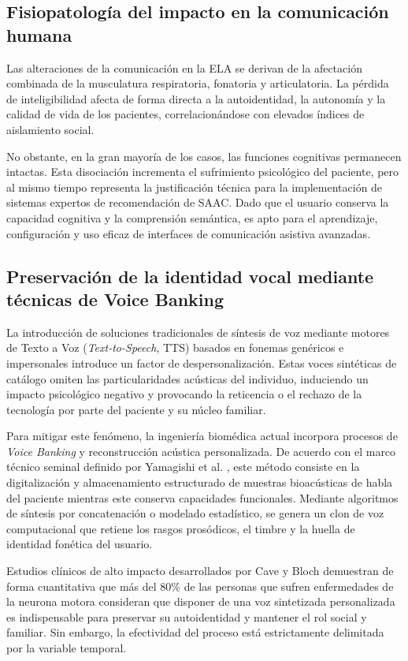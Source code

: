 \subsection{Fisiopatología del impacto en la comunicación humana}
Las alteraciones de la comunicación en la ELA se derivan de la afectación combinada de la musculatura respiratoria, fonatoria y articulatoria. La pérdida de inteligibilidad afecta de forma directa a la autoidentidad, la autonomía y la calidad de vida de los pacientes, correlacionándose con elevados índices de aislamiento social.

No obstante, en la gran mayoría de los casos, las funciones cognitivas  permanecen intactas. Esta disociación incrementa el sufrimiento psicológico del paciente, pero al mismo tiempo representa la justificación técnica para la implementación de sistemas expertos de recomendación de SAAC. Dado que el usuario conserva la capacidad cognitiva y la comprensión semántica, es apto para el aprendizaje, configuración y uso eficaz de interfaces de comunicación asistiva avanzadas.

\subsection{Preservación de la identidad vocal mediante técnicas de Voice Banking}
La introducción de soluciones tradicionales de síntesis de voz mediante motores de Texto a Voz (\textit{Text-to-Speech}, TTS) basados en fonemas genéricos e impersonales introduce un factor de despersonalización. Estas voces sintéticas de catálogo omiten las particularidades acústicas del individuo, induciendo un impacto psicológico negativo y provocando la reticencia o el rechazo de la tecnología por parte del paciente y su núcleo familiar.

Para mitigar este fenómeno, la ingeniería biomédica actual incorpora procesos de \textit{Voice Banking} y reconstrucción acústica personalizada. De acuerdo con el marco técnico seminal definido por Yamagishi et al. \cite{yamagishi2012speech}, este método consiste en la digitalización y almacenamiento estructurado de muestras bioacústicas de habla del paciente mientras este conserva capacidades funcionales. Mediante algoritmos de síntesis por concatenación o modelado estadístico, se genera un clon de voz computacional que retiene los rasgos prosódicos, el timbre y la huella de identidad fonética del usuario.

Estudios clínicos de alto impacto desarrollados por Cave y Bloch \break \cite{cave2021voice} demuestran de forma cuantitativa que más del 80\% de las personas que sufren enfermedades de la neurona motora consideran que disponer de una voz sintetizada personalizada es indispensable para preservar su autoidentidad y mantener el rol social y familiar. Sin embargo, la efectividad del proceso está estrictamente delimitada por la variable temporal. \cite{nature2025ai, rong2024multimodal}

